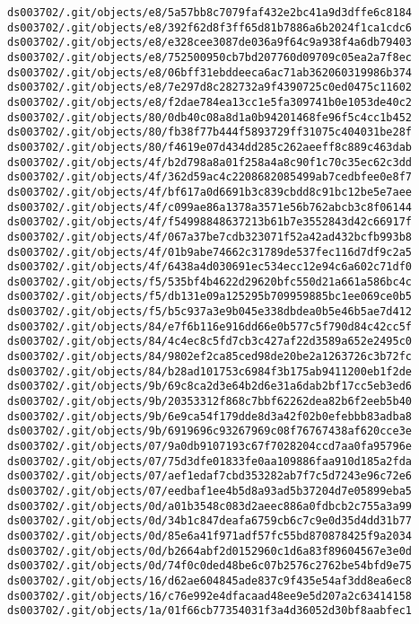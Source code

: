 \documentclass[11pt]{article}
\begin{document}
\begin{Verbatim}[commandchars=\\\{\}]
ds003702/.git/objects/e8/5a57bb8c7079faf432e2bc41a9d3dffe6c8184
ds003702/.git/objects/e8/392f62d8f3ff65d81b7886a6b2024f1ca1cdc6
ds003702/.git/objects/e8/e328cee3087de036a9f64c9a938f4a6db79403
ds003702/.git/objects/e8/752500950cb7bd207760d09709c05ea2a7f8ec
ds003702/.git/objects/e8/06bff31ebddeeca6ac71ab362060319986b374
ds003702/.git/objects/e8/7e297d8c282732a9f4390725c0ed0475c11602
ds003702/.git/objects/e8/f2dae784ea13cc1e5fa309741b0e1053de40c2
ds003702/.git/objects/80/0db40c08a8d1a0b94201468fe96f5c4cc1b452
ds003702/.git/objects/80/fb38f77b444f5893729ff31075c404031be28f
ds003702/.git/objects/80/f4619e07d434dd285c262aeeff8c889c463dab
ds003702/.git/objects/4f/b2d798a8a01f258a4a8c90f1c70c35ec62c3dd
ds003702/.git/objects/4f/362d59ac4c2208682085499ab7cedbfee0e8f7
ds003702/.git/objects/4f/bf617a0d6691b3c839cbdd8c91bc12be5e7aee
ds003702/.git/objects/4f/c099ae86a1378a3571e56b762abcb3c8f06144
ds003702/.git/objects/4f/f54998848637213b61b7e3552843d42c66917f
ds003702/.git/objects/4f/067a37be7cdb323071f52a42ad432bcfb993b8
ds003702/.git/objects/4f/01b9abe74662c31789de537fec116d7df9c2a5
ds003702/.git/objects/4f/6438a4d030691ec534ecc12e94c6a602c71df0
ds003702/.git/objects/f5/535bf4b4622d29620bfc550d21a661a586bc4c
ds003702/.git/objects/f5/db131e09a125295b709959885bc1ee069ce0b5
ds003702/.git/objects/f5/b5c937a3e9b045e338dbdea0b5e46b5ae7d412
ds003702/.git/objects/84/e7f6b116e916dd66e0b577c5f790d84c42cc5f
ds003702/.git/objects/84/4c4ec8c5fd7cb3c427af22d3589a652e2495c0
ds003702/.git/objects/84/9802ef2ca85ced98de20be2a1263726c3b72fc
ds003702/.git/objects/84/b28ad101753c6984f3b175ab9411200eb1f2de
ds003702/.git/objects/9b/69c8ca2d3e64b2d6e31a6dab2bf17cc5eb3ed6
ds003702/.git/objects/9b/20353312f868c7bbf62262dea82b6f2eeb5b40
ds003702/.git/objects/9b/6e9ca54f179dde8d3a42f02b0efebbb83adba8
ds003702/.git/objects/9b/6919696c93267969c08f76767438af620cce3e
ds003702/.git/objects/07/9a0db9107193c67f7028204ccd7aa0fa95796e
ds003702/.git/objects/07/75d3dfe01833fe0aa109886faa910d185a2fda
ds003702/.git/objects/07/aef1edaf7cbd353282ab7f7c5d7243e96c72e6
ds003702/.git/objects/07/eedbaf1ee4b5d8a93ad5b37204d7e05899eba5
ds003702/.git/objects/0d/a01b3548c083d2aeec886a0fdbcb2c755a3a99
ds003702/.git/objects/0d/34b1c847deafa6759cb6c7c9e0d35d4dd31b77
ds003702/.git/objects/0d/85e6a41f971adf57fc55bd870878425f9a2034
ds003702/.git/objects/0d/b2664abf2d0152960c1d6a83f89604567e3e0d
ds003702/.git/objects/0d/74f0c0ded48be6c07b2576c2762be54bfd9e75
ds003702/.git/objects/16/d62ae604845ade837c9f435e54af3dd8ea6ec8
ds003702/.git/objects/16/c76e992e4dfacaad48ee9e5d207a2c63414158
ds003702/.git/objects/1a/01f66cb77354031f3a4d36052d30bf8aabfec1

\end{Verbatim}
\end{document}
